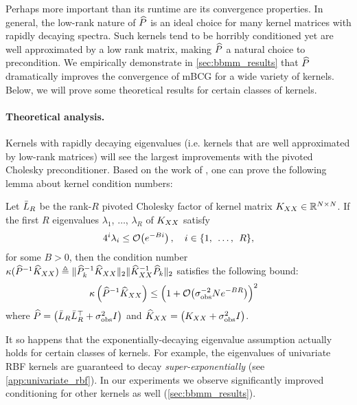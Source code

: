 Perhaps more important than its runtime are its convergence properties.
In general, the low-rank nature of $\widehat{P}$ is an ideal choice for many kernel matrices with rapidly decaying spectra.
Such kernels tend to be horribly conditioned yet are well approximated by a low rank matrix, making $\widehat{P}$ a natural choice to precondition.
We empirically demonstrate in \cref{sec:bbmm_results} that $\widehat{P}$ dramatically improves the convergence of mBCG for a wide variety of kernels.
Below, we will prove some theoretical results for certain classes of kernels.


\paragraph{Theoretical analysis.}
Kernels with rapidly decaying eigenvalues (i.e. kernels that are well approximated by low-rank matrices) will see the largest improvements with the pivoted Cholesky preconditioner.
Based on the work of \citet{harbrecht2012low}, one can prove the following lemma about kernel condition numbers:
%
\begin{lemma}
  \label{thm:condition_number}
  Let $\bar{L}_{R}$ be the rank-$R$ pivoted Cholesky factor of kernel matrix $K_{XX} \in \mathbb{R}^{N \times N}$.
  If the first $R$ eigenvalues $\lambda_1$, $\ldots$, $\lambda_R$ of $K_{XX}$ satisfy
	\begin{equation}
		4^{i}\lambda_{i} \leq \bigo{e^{-Bi}}, \quad i \in \{ 1, \:\: \ldots, \:\: R \},
		\label{eqn:pcp_condition}
	\end{equation}
	for some $B>0$, then the condition number $\kappa(\widehat{P}^{-1}\widehat{K}_{XX}) \triangleq \Vert \widehat{P}_{k}^{-1}\widehat{K}_{XX} \Vert_{2} \Vert \widehat{K}_{XX}^{-1}\widehat{P}_{k} \Vert_{2}$
	satisfies the following bound:
  \begin{align}
    \kappa \left( \trainP^{-1}\trainK \right)
    &\leq \Bigl( 1 + \bigo{\sigma^{-2}_\text{obs} N e^{-BR}} \Bigr)^2
		\nonumber
  \end{align}
	where $\widehat{P} = \left( \bar{L}_R \bar{L}_R^\top + \sigma^2_\text{obs} I \right)$ and $\widehat{K}_{XX} = \left( K_{XX} + \sigma^2_\text{obs} I \right)$.
\end{lemma}
%
It so happens that the exponentially-decaying eigenvalue assumption actually holds for certain classes of kernels.
For example, the eigenvalues of univariate RBF kernels are guaranteed to decay \emph{super-exponentially} (see \cref{app:univariate_rbf}).
In our experiments we observe significantly improved conditioning for other kernels as well (\cref{sec:bbmm_results}).

